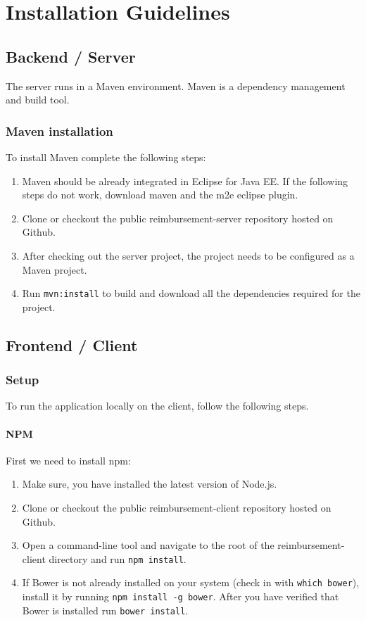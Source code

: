 \appendix

\chapter{Installation Guidelines}

\section{Backend / Server}
\label{sec:backend-server}

The server runs in a Maven environment. Maven is a dependency management and build tool.

\subsection{Maven installation}
To install Maven complete the following steps:

\begin{enumerate}
    \item Maven should be already integrated in Eclipse for Java EE. If the following steps do not work, download maven and the m2e eclipse plugin.
    \item Clone or checkout the public reimbursement-server repository hosted on Github.
    \item After checking out the server project, the project needs to be configured as a Maven project.
    \item Run \texttt{mvn:install} to build and download all the dependencies required for the project. 
\end{enumerate}


\section{Frontend / Client}

\subsection{Setup}
To run the application locally on the client, follow the following steps.

\subsubsection{NPM}
First we need to install npm:
\begin{enumerate}
  \item Make sure, you have installed the latest version of Node.js.
  \item Clone or checkout the public reimbursement-client repository hosted on Github.
  \item Open a command-line tool and navigate to the root of the reimbursement-client directory and run \texttt{npm install}.
  \item If Bower is not already installed on your system (check in with \texttt{which bower}), install it by running \texttt{npm install -g bower}. After you have verified that Bower is installed run \texttt{bower install}.
\end{enumerate}

